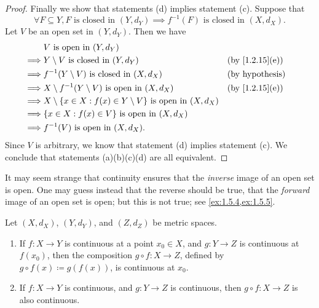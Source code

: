 \begin{proof}
  Finally we show that statements (d) implies statement (c).
  Suppose that
  \[
    \forall F \subseteq Y, F \text{ is closed in } (Y, d_Y) \implies f^{-1}(F) \text{ is closed in } (X, d_X).
  \]
  Let \(V\) be an open set in \((Y, d_Y)\).
  Then we have
  \begin{align*}
             & V \text{ is open in } (Y, d_Y)                                                                                  \\
    \implies & Y \setminus V \text{ is closed in } (Y, d_Y)                                  &  & \text{(by \cref{1.2.15}(e))} \\
    \implies & f^{-1}(Y \setminus V) \text{ is closed in } (X, d_X)                          &  & \text{(by hypothesis)}       \\
    \implies & X \setminus f^{-1}(Y \setminus V) \text{ is open in } (X, d_X)                &  & \text{(by \cref{1.2.15}(e))} \\
    \implies & X \setminus \{x \in X : f(x) \in Y \setminus V\} \text{ is open in } (X, d_X)                                   \\
    \implies & \{x \in X : f(x) \in V\} \text{ is open in } (X, d_X)                                                           \\
    \implies & f^{-1}(V) \text{ is open in } (X, d_X).
  \end{align*}
  Since \(V\) is arbitrary, we know that statement (d) implies statement (c).
  We conclude that statements (a)(b)(c)(d) are all equivalent.
\end{proof}

\begin{rmk}\label{2.1.6}
  It may seem strange that continuity ensures that the \emph{inverse} image of an open set is open.
  One may guess instead that the reverse should be true, that the \emph{forward} image of an open set is open;
  but this is not true;
  see \cref{ex:1.5.4,ex:1.5.5}.
\end{rmk}

\begin{cor}\label{2.1.7}
  Let \((X, d_X)\), \((Y, d_Y)\), and \((Z, d_Z)\) be metric spaces.
  \begin{enumerate}
    \item If \(f : X \to Y\) is continuous at a point \(x_0 \in X\), and \(g : Y \to Z\) is continuous at \(f(x_0)\), then the composition \(g \circ f : X \to Z\), defined by \(g \circ f(x) \coloneqq g(f(x))\), is continuous at \(x_0\).
    \item If \(f : X \to Y\) is continuous, and \(g : Y \to Z\) is continuous, then \(g \circ f : X \to Z\) is also continuous.
  \end{enumerate}
\end{cor}

